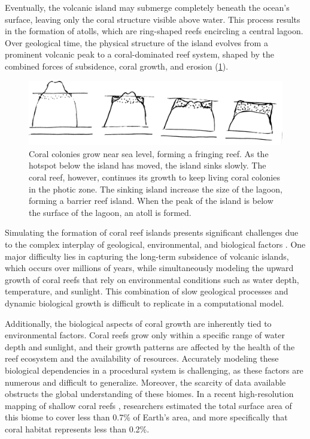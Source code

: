 Eventually, the volcanic island may submerge completely beneath the ocean's surface, leaving only the coral structure visible above water. This process results in the formation of atolls, which are ring-shaped reefs encircling a central lagoon. Over geological time, the physical structure of the island evolves from a prominent volcanic peak to a coral-dominated reef system, shaped by the combined forces of subsidence, coral growth, and erosion (\cref{fig:coral-island-reef-growth}).

\begin{figure}[H]
    \centering
    \includegraphics[width = \linewidth]{other_images/Drawings/Darwin_corals.jpg} %
    \caption{Coral colonies grow near sea level, forming a fringing reef. As the hotspot below the island has moved, the island sinks slowly. The coral reef, however, continues its growth to keep living coral colonies in the photic zone. The sinking island increase the size of the lagoon, forming a barrier reef island. When the peak of the island is below the surface of the lagoon, an atoll is formed. }
    \label{fig:coral-island-reef-growth}
\end{figure}

Simulating the formation of coral reef islands presents significant challenges due to the complex interplay of geological, environmental, and biological factors \cite{Hopley2014}. One major difficulty lies in capturing the long-term subsidence of volcanic islands, which occurs over millions of years, while simultaneously modeling the upward growth of coral reefs that rely on environmental conditions such as water depth, temperature, and sunlight. This combination of slow geological processes and dynamic biological growth is difficult to replicate in a computational model.

Additionally, the biological aspects of coral growth are inherently tied to environmental factors. Coral reefs grow only within a specific range of water depth and sunlight, and their growth patterns are affected by the health of the reef ecosystem and the availability of resources. Accurately modeling these biological dependencies in a procedural system is challenging, as these factors are numerous and difficult to generalize. Moreover, the scarcity of data available obstructs the global understanding of these biomes. In a recent high-resolution mapping of shallow coral reefs \cite{Lyons2024}, researchers estimated the total surface area of this biome to cover less than 0.7\% of Earth's area, and more specifically that coral habitat represents less than 0.2\%.

